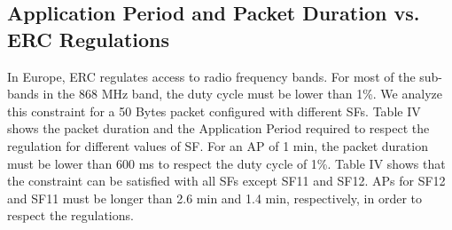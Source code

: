 \subsection{Application Period and Packet Duration vs. ERC Regulations}

In Europe,
	ERC regulates access to radio frequency bands.
For most of the sub-bands in the 868 MHz band,
	the duty cycle must be lower than 1\%.
We analyze
this constraint for a 50 Bytes packet configured with different SFs.
Table IV shows the packet duration and the Application Period required to respect the regulation for different values of SF.
For an AP of 1 min,
	the packet duration must be lower than 600 ms to respect the duty cycle of 1\%.
Table IV
shows that the constraint can be satisfied with all SFs except SF11 and SF12.
APs for SF12 and SF11 must be longer than 2.6 min and 1.4 min,
	respectively,
	in order to respect the regulations.



